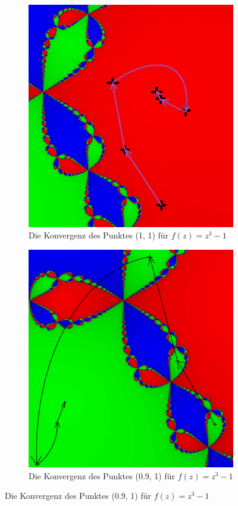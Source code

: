\documentclass[a4paper,12pt]{llncs}
\makeatletter
\newcommand\nocaption{%
	\renewcommand\p@subfigure{}
	\renewcommand\thesubfigure{\thefigure\alph{subfigure}}
}
\numberwithin{equation}{section}
\makeatother
\begin{document}
\begin{figure}[ht]   
	\nocaption
	\begin{subfigure}{.5\textwidth}
		\centering
		\includegraphics[width=.7\linewidth]{figures/output_points3}
		\captionsetup{width=0.8\textwidth}
		\caption{Die Konvergenz des Punktes (1, 1) für $f(z)=z^3-1$ }
		\label{fig:output_points3}
	\end{subfigure}%
	\begin{subfigure}{.5\textwidth}
		\centering
		\includegraphics[width=.7\linewidth]{figures/output_points_g3}
		\captionsetup{width=0.8\textwidth}
		\caption{Die Konvergenz des Punktes (0.9, 1) für $f(z)=z^3-1$ }
		\label{fig:output_points_g3}
	\end{subfigure}%
\end{figure}
\end{document}
